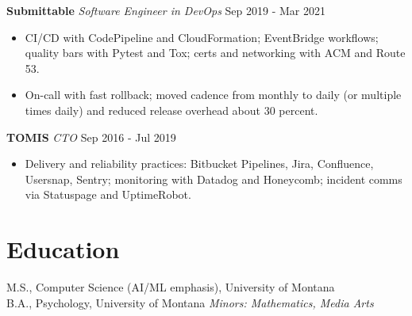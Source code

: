 \documentclass[10pt]{article}
\begin{document}
\noindent\textbf{Submittable} \textit{Software Engineer in DevOps} \hfill Sep 2019 - Mar 2021\par
\begin{itemize}
  \item CI/CD with CodePipeline and CloudFormation; EventBridge workflows; quality bars with Pytest and Tox; certs and networking with ACM and Route 53.
  \item On-call with fast rollback; moved cadence from monthly to daily (or multiple times daily) and reduced release overhead about 30 percent.
\end{itemize}

\noindent\textbf{TOMIS} \textit{CTO} \hfill Sep 2016 - Jul 2019\par
\begin{itemize}
  \item Delivery and reliability practices: Bitbucket Pipelines, Jira, Confluence, Usersnap, Sentry; monitoring with Datadog and Honeycomb; incident comms via Statuspage and UptimeRobot.
\end{itemize}

\section*{Education}
M.S., Computer Science (AI/ML emphasis), University of Montana \\
B.A., Psychology, University of Montana \quad \emph{Minors: Mathematics, Media Arts}
\end{document}
